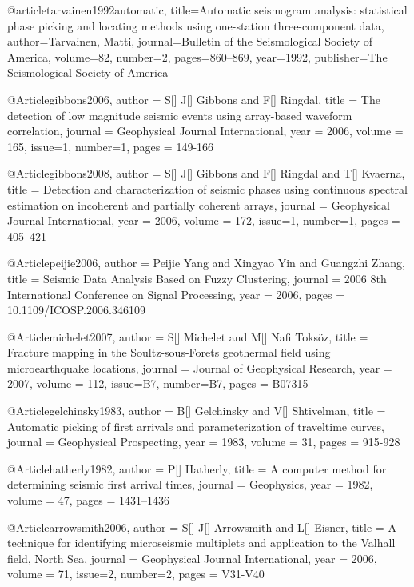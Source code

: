 @article{tarvainen1992automatic,
  title={Automatic seismogram analysis: statistical phase picking and locating methods using one-station three-component data},
  author={Tarvainen, Matti},
  journal={Bulletin of the Seismological Society of America},
  volume={82},
  number={2},
  pages={860--869},
  year={1992},
  publisher={The Seismological Society of America}
}


  @Article{gibbons2006,
  author = 	 {S[] J[] Gibbons and F[] Ringdal},
  title = 	 {The detection of low magnitude seismic events using array-based waveform correlation},
  journal = 	 {Geophysical Journal International},
  year = 	 2006,
  volume = 	 165,
  issue=1,
  number=1,
  pages = 	 {149-166}}
  
   @Article{gibbons2008,
  author = 	 {S[] J[] Gibbons and F[] Ringdal and T[] Kvaerna},
  title = 	 {Detection and characterization of seismic phases using continuous spectral estimation on incoherent and partially coherent arrays},
  journal = 	 {Geophysical Journal International},
  year = 	 2006,
  volume = 	 172,
  issue=1,
  number=1,
  pages = 	 {405–421}} 
  
   @Article{peijie2006,
  author = 	 {Peijie Yang and Xingyao Yin and Guangzhi Zhang},
  title = 	 {Seismic Data Analysis Based on Fuzzy Clustering},
  journal = 	 {2006 8th International Conference on Signal Processing},
  year = 	 2006,
  pages = 	 {10.1109/ICOSP.2006.346109}} 

    @Article{michelet2007,
  author = 	 {S[] Michelet and M[] Nafi Toks\"{o}z},
  title = 	 {Fracture mapping in the Soultz-sous-Forets geothermal field using microearthquake locations},
  journal = 	 {Journal of Geophysical Research},
  year = 	 2007,
  volume = 	 112,
  issue=B7,
  number=B7,
  pages = 	 {B07315}} 
 
    @Article{gelchinsky1983,
  author = 	 {B[] Gelchinsky and V[] Shtivelman},
  title = 	 {Automatic picking of first arrivals and parameterization of traveltime curves},
  journal = 	 {Geophysical Prospecting},
  year = 	 1983,
  volume = 	 31,
  pages = 	 {915-928}} 

    @Article{hatherly1982,
  author = 	 {P[] Hatherly},
  title = 	 {A computer method for determining seismic first arrival times},
  journal = 	 {Geophysics},
  year = 	 1982,
  volume = 	 47,
  pages = 	 {1431–1436}} 
    
   @Article{arrowsmith2006,
  author = 	 {S[] J[] Arrowsmith and L[] Eisner},
  title = 	 {A technique for identifying microseismic multiplets and application to the Valhall field, North Sea},
  journal = 	 {Geophysical Journal International},
  year = 	 2006,
  volume = 	 71,
  issue=2,
  number=2,
  pages = 	 {V31-V40}} 
  
